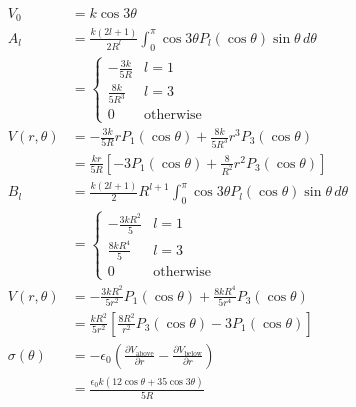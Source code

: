 \documentclass{article}
\begin{document}
\begin{align*}
  V_0            & = k \cos 3 \theta                                                                                                    \\
  A_l            & = \frac{k (2 l + 1)}{2 R^l} \int_0^\pi \cos 3 \theta P_l (\cos \theta) \sin \theta \,d \theta                        \\
                 & = \begin{cases}
                       -\frac{3 k}{5 R}  & l = 1            \\
                       \frac{8 k}{5 R^3} & l = 3            \\
                       0                 & \text{otherwise}
                     \end{cases}                                                                               \\
  V(r, \theta)   & = -\frac{3 k}{5 R} r P_1(\cos \theta) + \frac{8 k}{5 R^3} r^3 P_3(\cos \theta)                                       \\
                 & = \frac{k r}{5 R} \left[ -3 P_1(\cos \theta) + \frac{8}{R^2} r^2 P_3(\cos \theta) \right]                            \\
  B_l            & = \frac{k (2 l + 1)}{2} R^{l + 1} \int_0^\pi \cos 3 \theta P_l(\cos \theta) \sin \theta \,d \theta                   \\
                 & = \begin{cases}
                       -\frac{3 k R^2}{5} & l = 1            \\
                       \frac{8 k R^4}{5}  & l = 3            \\
                       0                  & \text{otherwise}
                     \end{cases}                                                                              \\
  V(r, \theta)   & = -\frac{3 k R^2}{5 r^2} P_1(\cos \theta) + \frac{8 k R^4}{5 r^4} P_3(\cos \theta)                                   \\
                 & = \frac{k R^2}{5 r^2} \left[ \frac{8 R^2}{r^2} P_3(\cos \theta) - 3 P_1(\cos \theta) \right]                         \\
  \sigma(\theta) & = -\epsilon_0 \left( \frac{\partial V_\text{above}}{\partial r} - \frac{\partial V_\text{below}}{\partial r} \right) \\
                 & = \frac{\epsilon_0 k (12 \cos \theta + 35 \cos 3 \theta)}{5 R}
\end{align*}
\end{document}
